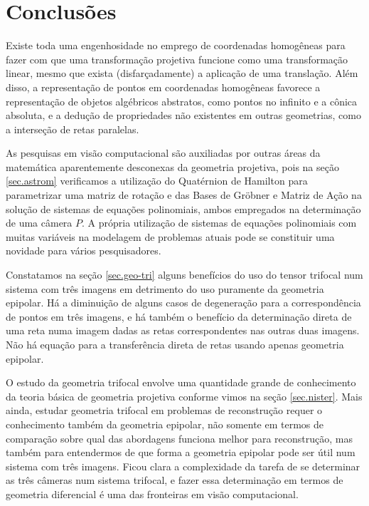 \section{Conclusões}

Existe toda uma engenhosidade no emprego de coordenadas homogêneas para fazer com que uma transformação projetiva funcione como uma transformação linear, mesmo que exista (disfarçadamente) a aplicação de uma translação. Além disso, a representação de pontos em coordenadas homogêneas favorece a representação de objetos algébricos abstratos, como pontos no infinito e a cônica absoluta, e a dedução de propriedades não existentes em outras geometrias, como a interseção de retas paralelas.

As pesquisas em visão computacional são auxiliadas por outras áreas da matemática aparentemente desconexas da geometria projetiva, pois na seção \ref{sec.astrom} verificamos a utilização do Quatérnion de Hamilton para parametrizar uma matriz de rotação e das Bases de Gr\"obner e Matriz de Ação na solução de sistemas de equações polinomiais, ambos empregados na determinação de uma câmera $P$. A própria utilização de sistemas de equações polinomiais com muitas variáveis na modelagem de problemas atuais pode se constituir uma novidade para vários pesquisadores.

Constatamos na seção \ref{sec.geo-tri} alguns benefícios do uso do tensor trifocal num sistema com três imagens em detrimento do uso puramente da geometria epipolar. Há a diminuição de alguns casos de degeneração para a correspondência de pontos em três imagens, e há também o benefício da determinação direta de uma reta numa imagem dadas as retas correspondentes nas outras duas imagens. Não há equação para a transferência direta de retas usando apenas geometria epipolar.

O estudo da geometria trifocal envolve uma quantidade grande de conhecimento da teoria básica de geometria projetiva conforme vimos na seção \ref{sec.nister}. Mais ainda, estudar geometria trifocal em problemas de reconstrução requer o conhecimento também da geometria epipolar, não somente em termos de comparação sobre qual das abordagens funciona melhor para reconstrução, mas também para entendermos de que forma a geometria epipolar pode ser útil num sistema com três imagens. Ficou clara a complexidade da tarefa de se determinar as três câmeras num sistema trifocal, e fazer essa determinação em termos de geometria diferencial é uma das fronteiras em visão computacional. 

